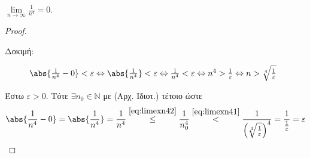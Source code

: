 \documentclass[main.tex]{subfiles}
\begin{document}
\begin{examples}
\begin{enumerate}[i)]
            \pagebreak

        \item $ \lim\limits_{n \to \infty} \frac{1}{n^{4}} = 0 $. 
            \begin{proof}
            \item {}
                \begin{description}
                    \item[Δοκιμή:]$ \abs{\frac{1}{n^{4}} - 0} < \varepsilon 
                        \Leftrightarrow \abs{\frac{1}{n^{4}}} < \varepsilon 
                        \Leftrightarrow \frac{1}{n^{4}} < \varepsilon
                        \Leftrightarrow n^{4} > \frac{1}{\varepsilon}
                        \Leftrightarrow n > \sqrt[4]{\frac{1}{\varepsilon}}$
                \end{description}
                Έστω $ \varepsilon >0 $. Τότε $ \exists n_{0}  \in 
                \mathbb{N}$ με  (Αρχ. Ιδιοτ.)
                τέτοιο ώστε  
                \[
                    \abs{\frac{1}{n^{4}} - 0 } = \abs{\frac{1}{n^{4}}} 
                    = \frac{1}{n^{4}} \overset{\eqref{eq:limexn42}}\leq 
                    \frac{1}{n_{0}^{4}} \overset{\eqref{eq:limexn41}}{<}
                    \frac{1}{\left(\sqrt[4]{\frac{1}{\varepsilon}
                    }\right)^{4}} = \frac{1}{\frac{1}{\varepsilon}} =  
                    \varepsilon
                \] 
            \end{proof}


\end{enumerate}
\end{examples}
\end{document}
